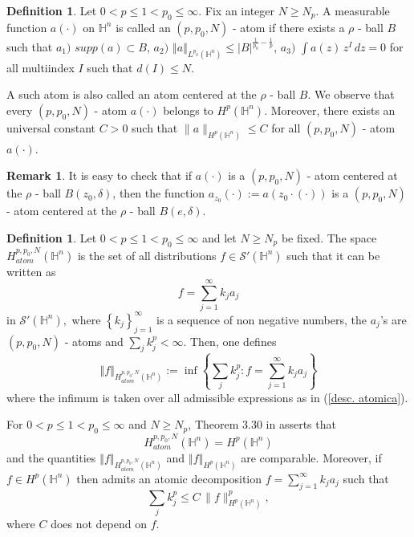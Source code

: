 \documentclass[reqno,10pt]{article}
\theoremstyle{definition}
\newtheorem{definition}[theorem]{Definition}
\newtheorem{remark}[theorem]{Remark}
\numberwithin{equation}{section}
\numberwithin{theorem}{section}
\begin{document}
\begin{definition}
Let $0 < p \leq 1 < p_{0} \leq \infty$. Fix an integer $N \geq N_{p}$. A measurable function $a(\cdot)$ on $\mathbb{H}^{n}$ is called an 
$(p, p_{0}, N)$ - atom if there exists a $\rho$ - ball $B$ such that \newline
$a_{1})$ $\textit{supp}\left( a\right) \subset B$, \newline
$a_{2})$ $\left\Vert a \right\Vert_{L^{p_{0}}(\mathbb{H}^{n})} \leq 
\left\vert B \right\vert^{\frac{1}{p_{0}} - \frac{1}{p}}$, \newline
$a_{3})$ $\int a(z) \, z^{I} \, dz = 0$ for all multiindex $I$ such that $d(I) \leq N$.
\end{definition}
A such atom is also called an atom centered at the $\rho$ - ball $B$. We observe that every $(p, p_{0}, N)$ - atom 
$a(\cdot)$ belongs to $H^{p}(\mathbb{H}^{n})$. Moreover, there exists an universal constant $C > 0$ such that $\| a \|_{H^p(\mathbb{H}^n)} \leq C$ for all $(p, p_{0}, N)$ - atom $a(\cdot)$.

\begin{remark} \label{atomo trasladado}
It is easy to check that if $a(\cdot)$ is a $(p, p_{0}, N)$ - atom centered at the $\rho$ - ball $B(z_0, \delta)$, then the function 
$a_{z_0}(\cdot) := a(z_0 \cdot (\cdot))$ is a $(p, p_{0}, N)$ - atom centered at the $\rho$ - ball $B(e, \delta)$.
\end{remark}

\begin{definition} Let $0 < p \leq 1 < p_{0} \leq \infty$ and let $N \geq N_{p}$ be fixed. The space 
$H_{atom}^{p, p_{0}, N}\left( \mathbb{H}^{n}\right)$ is the set of all distributions $f \in \mathcal{S}'(\mathbb{H}^{n})$ such that it can be
written as
\begin{equation}
f=\sum\limits_{j=1}^{\infty }k_{j}a_{j}  \label{desc. atomica}
\end{equation}
in $\mathcal{S}'(\mathbb{H}^{n}),$ where $\left\{ k_{j}\right\}_{j=1}^{\infty }$ is a sequence of non negative numbers, the $a_{j}$'s are 
$(p, p_{0}, N)$ - atoms and $\sum_j k_j^p < \infty$. Then, one defines
\[
\left\Vert f\right\Vert_{H_{atom}^{p, p_{0}, N}(\mathbb{H}^n)} :=\inf \left\{ \sum_j k_j^p : f=\sum\limits_{j=1}^{\infty }k_{j}a_{j} \right\}
\]
where the infimum is taken over all admissible expressions as in (\ref{desc. atomica}).
\end{definition}

For $0 < p \leq 1 < p_{0} \leq \infty$ and $N \geq N_{p}$, Theorem 3.30 in \cite{Foll-St} asserts that
\[
H_{atom}^{p, p_{0}, N}(\mathbb{H}^n) = H^p(\mathbb{H}^n)
\] 
and the quantities $\left\Vert f\right\Vert_{H_{atom}^{p, p_{0}, N}(\mathbb{H}^n)}$ and 
$\left\Vert f\right\Vert _{H^{p}(\mathbb{H}^n)}$ are comparable. Moreover, if $f \in H^p(\mathbb{H}^n)$ then admits an atomic decomposition 
$f=\sum\limits_{j=1}^{\infty }k_{j}a_{j}$ such that 
\[
\sum_j k_j^p \leq C \, \|f \|_{H^{p}(\mathbb{H}^n)}^p,
\]
where $C$ does not depend on $f$.
\end{document}
